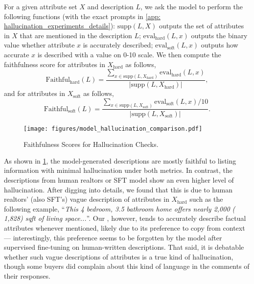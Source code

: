 For a given attribute set $X$ and description $L$, we ask the model to perform the following functions (with the exact prompts in \cref{app: hallucination_experiments_details}): $\text{supp}(L, X)$ outputs the set of attributes in $X$ that are mentioned in the description $L$; $\text{eval}_{\text{hard}}(L, x)$ outputs the binary value whether attribute $x$ is accurately described; $\text{eval}_{\text{soft}}(L, x)$ outputs how accurate $x$ is described with a value on 0-10 scale. We then compute the faithfulness score for attributes in $X_{\text{hard}}$ as follows,
\begin{equation*}
    \text{Faithful}_{\text{hard}}(L) = \frac{\sum_{x \in \text{supp}(L, X_{\text{hard}})}\text{eval}_{\text{hard}}(L, x)}{ |\text{supp}(L, X_{\text{hard}})|},
\end{equation*}
and for attributes in $X_{\text{soft}}$ as follows,
\begin{equation*}
    \text{Faithful}_{\text{soft}}(L) = \frac{\sum_{x \in \text{supp}(L, X_{\text{soft}})}\text{eval}_{\text{soft}}(L, x)/10}{ |\text{supp}(L, X_{\text{soft}})|}. 
\end{equation*}

\begin{figure}
  \centering
  \texttt{[image: figures/model\_hallucination\_comparison.pdf]}
   \vspace{-0.3cm}
    \caption{Faithfulness Scores for Hallucination Checks.}
    \label{fig: hallucination_comparison}
\end{figure}

As shown in \cref{fig: hallucination_comparison}, the model-generated descriptions are mostly faithful to listing information with minimal hallucination under both metrics. In contrast, the descriptions from human realtors or SFT model show an even higher level of hallucination. After digging into details, we found that this is  due to  human realtors' (also SFT's) vague description of attributes in $X_{\text{hard}}$ such as the following example,  
``\textit{This 4 bedroom, 3.5 bathroom home offers {\color{red}nearly 2,000} ({\color{blue} 1,828}) sqft of living space...}''.
Our \agentname, however, tends to accurately describe factual attributes whenever mentioned, likely due to its preference to copy from context --- interestingly, this preference seems to be forgotten by the model after supervised fine-tuning on human-written descriptions.  That said, it is debatable whether such vague descriptions of attributes is a true kind of hallucination, though some buyers did complain about this kind of language in the comments of their responses.

